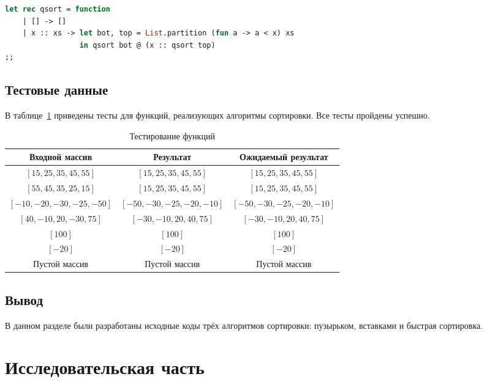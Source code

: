 \documentclass[12pt]{report}
\begin{document}
\begin{lstlisting}[label=some-code,caption=Функция быстрой сортировки,language=Caml]
let rec qsort = function
    | [] -> []
    | x :: xs -> let bot, top = List.partition (fun a -> a < x) xs
                 in qsort bot @ (x :: qsort top)
;;
\end{lstlisting}

\section{Тестовые данные}

В таблице~\ref{tbl:test} приведены тесты для функций, реализующих алгоритмы сортировки. Все тесты пройдены успешно.

\begin{table}[h!]
	\begin{center}
		\begin{tabular}{|c|c|c|}
			\hline
			Входной массив & Результат & Ожидаемый результат \\ 
			\hline
			$[15, 25, 35, 45, 55]$ & $[15, 25, 35, 45, 55]$  & $[15, 25, 35, 45, 55]$\\\hline
			$[55, 45, 35, 25, 15]$  & $[15, 25, 35, 45, 55]$ & $[15, 25, 35, 45, 55]$\\\hline
			$[-10, -20, -30, -25, -50]$  & $[-50, -30, -25, -20, -10]$  & $[-50, -30, -25, -20, -10]$\\\hline
			$[40, -10, 20, -30, 75]$  & $[-30, -10, 20, 40, 75]$  & $[-30, -10, 20, 40, 75]$\\\hline
			$[100]$  & $[100]$  & $[100]$\\\hline
			$[-20]$  & $[-20]$  & $[-20]$\\\hline
			Пустой массив  & Пустой массив  & Пустой массив\\
			\hline
		\end{tabular}
		\caption{\label{tbl:test}Тестирование функций}
	\end{center}
\end{table}

\section{Вывод}

В данном разделе были разработаны исходные коды трёх алгоритмов сортировки: пузырьком, вставками и быстрая сортировка.

\chapter{Исследовательская часть}
\end{document}
